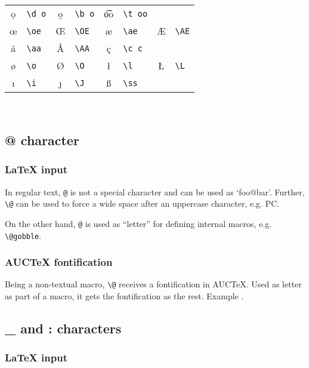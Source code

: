 \documentclass[a4paper]{article}
\begin{document}
\begin{description}
\begin{center}
\begin{tabular}{@{}*{4}{cl}@{}}
      \d o    & \verb|\d o| & \b o & \verb|\b o|
      & \t oo & \verb|\t oo|                     \\[6pt]
      \oe     & \verb|\oe|  & \OE  & \verb|\OE|
      & \ae   & \verb|\ae|  & \AE  & \verb|\AE|  \\
      \aa     & \verb|\aa|  & \AA  & \verb|\AA|
      & \c c  & \verb|\c c|                      \\[6pt]
      \o      & \verb|\o|   & \O   & \verb|\O|
      & \l    & \verb|\l|   & \L   & \verb|\L|   \\
      \i      & \verb|\i|   & \j   & \verb|\J|
      & \ss   & \verb|\ss|                       \\
      \hline
    \end{tabular}\\[1ex]
  \end{center}
\end{description}

\subsection{@ character}

\subsubsection{\protect\LaTeX{} input}

In regular text, \verb|@| is not a special character and can be used
as `foo@bar'.  Further, \verb|\@| can be used to force a wide space
after an uppercase character, e.g. PC\@.

On the other hand, \verb|@| is used as ``letter'' for defining internal
macros, e.g. \verb|\@gobble|.

\subsubsection{AUC\protect\TeX{} fontification}

Being a non-textual macro, \verb|\@| receives a fontification in
AUC\TeX.  Used as letter as part of a macro, it gets the fontification
as the rest. Example \bgroup\ttfamily \string\@gobble\egroup.

\subsection{\_ and : characters}

\subsubsection{\protect\LaTeX{} input}
\end{document}
